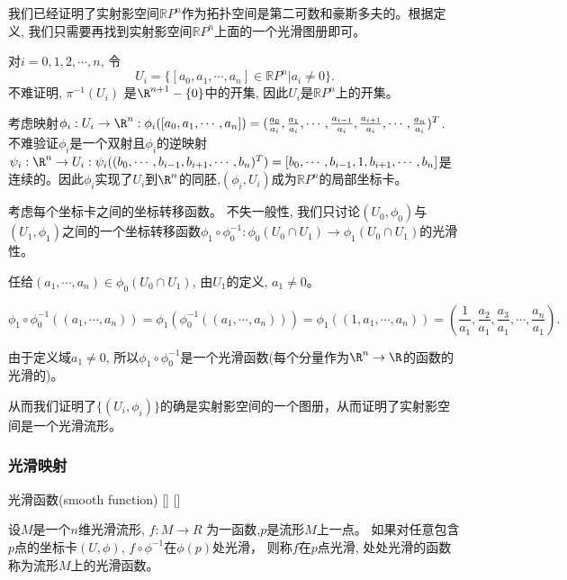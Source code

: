 \documentclass[UTF8]{ctexart}
\begin{document}
    \begin{prf}
        
        
        
        

        我们已经证明了实射影空间$\mathbb{R}P^n$作为拓扑空间是第二可数和豪斯多夫的。根据定义, 我们只需要再找到实射影空间$\mathbb{R}P^n$上面的一个光滑图册即可。

        对$i = 0,1,2,\cdots,n$, 令
        \[
            U_i = \{[a_0, a_1, \cdots , a_n] \in \mathbb{R}P^n | a_i \neq 0\}.
        \]
        不难证明, $\pi^{-1}(U_i)$ 是$\R^{n+1}-\{0\}$中的开集, 因此$U_i$是$\mathbb{R}P^n$上的开集。

        考虑映射$\phi_i : U_i \rightarrow \R^n : \phi_i([a_0, a_1, \cdots , a_n]) = (\frac{a_0}{a_i} ,\frac{a_1}{a_i} , \cdots , \frac{a_{i-1}}{a_i},\frac{a_{i+1}}{a_i},\cdots, \frac{a_{n}}{a_i})^{T}$. 不难验证$\phi_i$是一个双射且$\phi_i$的逆映射$\psi_i : \R^n \rightarrow U_i : \psi_i((b_0, \cdots,b_{i-1},b_{i+1},\cdots, b_n)^T) = [b_0, \cdots,b_{i-1},1,b_{i+1},\cdots, b_n]$是连续的。因此$\phi_i$实现了$U_i$到$\R^n$的同胚,$(\phi_i,U_i)$成为$\mathbb{R}P^n$的局部坐标卡。 

        考虑每个坐标卡之间的坐标转移函数。 不失一般性, 我们只讨论$(U_0, \phi_0)$与$(U_1, \phi_1)$之间的一个坐标转移函数$\phi_1 \circ \phi_0^{-1} : \phi_0(U_0 \cap U_1) \rightarrow \phi_1(U_0 \cap U_1)$的光滑性。

        任给$(a_1,\cdots,a_n) \in \phi_0(U_0 \cap U_1)$, 由$U_1$的定义, $a_1 \neq 0$。

        \[
            \phi_1 \circ \phi_0^{-1}((a_1,\cdots,a_n)) = \phi_1(\phi_0^{-1}((a_1,\cdots,a_n))) = \phi_1((1, a_1,\cdots,a_n))
            = (\frac{1}{a_1}, \frac{a_2}{a_1},\frac{a_3}{a_1}, \cdots, \frac{a_n}{a_1}).
        \]

        由于定义域$a_1 \neq 0$, 所以$\phi_1 \circ \phi_0^{-1}$是一个光滑函数(每个分量作为$\R^n \rightarrow \R$的函数的光滑的)。

        从而我们证明了$\{(U_i ,\phi_i)\}$的确是实射影空间的一个图册，从而证明了实射影空间是一个光滑流形。
    \end{prf}
    
    \subsubsection{光滑映射}
    
    \begin{dfn}
        []
        {光滑函数(smooth function)}
        []
        []

        设$M$是一个$n$维光滑流形, $f : M \rightarrow R $ 为一函数,$p$是流形$M$上一点。
        如果对任意包含$p$点的坐标卡$(U,\phi)$,
        $f \circ \phi^{−1}$在$\phi(p)$处光滑，
        则称$f$在$p$点光滑,
        处处光滑的函数称为流形$M$上的光滑函数。
    \end{dfn}
\end{document}
